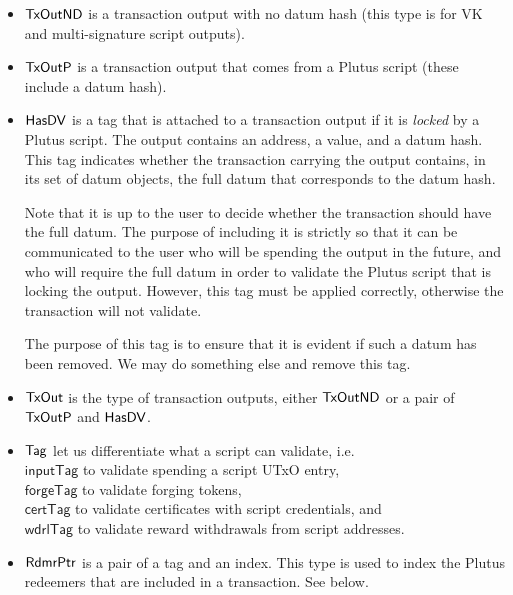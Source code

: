 \begin{itemize}
  \item $\mathsf{TxOutND}$ is a transaction output with no datum hash
  (this type is for VK and multi-signature script outputs).

  \item $\mathsf{TxOutP}$ is a transaction output that comes from a Plutus script (these include a datum hash).

  \item $\mathsf{HasDV}$
  is a tag that is attached to a transaction output if it is \emph{locked} by a Plutus
  script. The output contains an address, a value, and a datum hash.
  This tag indicates whether the transaction carrying the output
  contains, in its set of datum objects, the full datum that corresponds
  to the datum hash.

  Note that it is up to the user   to decide whether the transaction should have the full datum. The purpose of
  including it is strictly so that it can be communicated to the user who will be spending
  the output in the future, and who will require the full datum in order to validate
  the Plutus script that is locking the output. However, this tag must be applied
  correctly, otherwise the transaction will not validate.
  \begin{note}
    The purpose of this tag is to ensure that it is evident if such a
    datum has been removed. We may do something else and remove this tag.
  \end{note}

  \item $\mathsf{TxOut}$ is the type of transaction outputs, either
  $\mathsf{TxOutND}$ or a pair of $\mathsf{TxOutP}$ and $\mathsf{HasDV}$.

  \item $\mathsf{Tag}$ let us differentiate what a script
  can validate, i.e. \\
  $\mathsf{inputTag}$ to validate spending a script UTxO entry, \\
  $\mathsf{forgeTag}$ to validate forging tokens, \\
  $\mathsf{certTag}$  to validate certificates with script credentials, and  \\
  $\mathsf{wdrlTag}$ to validate reward withdrawals from script addresses.

  \item $\mathsf{RdmrPtr}$ is a pair of a tag and an index. This type is
  used to index the Plutus redeemers that are included in a transaction. See
  below.

\end{itemize}


